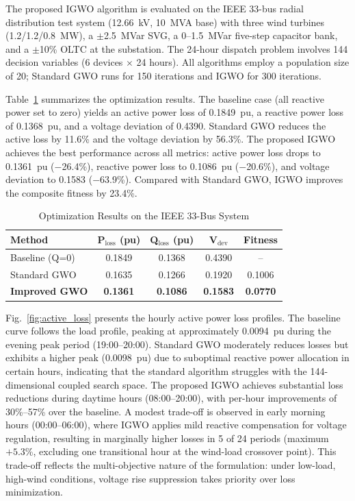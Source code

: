 The proposed IGWO algorithm is evaluated on the IEEE 33-bus radial distribution test system (12.66~kV, 10~MVA base) with three wind turbines (1.2/1.2/0.8~MW), a $\pm$2.5~MVar SVG, a 0--1.5~MVar five-step capacitor bank, and a $\pm$10\% OLTC at the substation. The 24-hour dispatch problem involves 144 decision variables (6 devices $\times$ 24 hours). All algorithms employ a population size of 20; Standard GWO runs for 150 iterations and IGWO for 300 iterations.

Table~\ref{tab:results} summarizes the optimization results. The baseline case (all reactive power set to zero) yields an active power loss of 0.1849~pu, a reactive power loss of 0.1368~pu, and a voltage deviation of 0.4390. Standard GWO reduces the active loss by 11.6\% and the voltage deviation by 56.3\%. The proposed IGWO achieves the best performance across all metrics: active power loss drops to 0.1361~pu ($-$26.4\%), reactive power loss to 0.1086~pu ($-$20.6\%), and voltage deviation to 0.1583 ($-$63.9\%). Compared with Standard GWO, IGWO improves the composite fitness by 23.4\%.

\begin{table}[!t]
  \centering
  \caption{Optimization Results on the IEEE 33-Bus System}
  \label{tab:results}
  \begin{tabular}{lcccc}
    \hline
    Method & P$_{\text{loss}}$ (pu) & Q$_{\text{loss}}$ (pu) & V$_{\text{dev}}$ & Fitness \\
    \hline
    Baseline (Q=0)  & 0.1849 & 0.1368 & 0.4390 & -- \\
    Standard GWO    & 0.1635 & 0.1266 & 0.1920 & 0.1006 \\
    \textbf{Improved GWO} & \textbf{0.1361} & \textbf{0.1086} & \textbf{0.1583} & \textbf{0.0770} \\
    \hline
  \end{tabular}
\end{table}

Fig.~\ref{fig:active_loss} presents the hourly active power loss profiles. The baseline curve follows the load profile, peaking at approximately 0.0094~pu during the evening peak period (19:00--20:00). Standard GWO moderately reduces losses but exhibits a higher peak (0.0098~pu) due to suboptimal reactive power allocation in certain hours, indicating that the standard algorithm struggles with the 144-dimensional coupled search space. The proposed IGWO achieves substantial loss reductions during daytime hours (08:00--20:00), with per-hour improvements of 30\%--57\% over the baseline. A modest trade-off is observed in early morning hours (00:00--06:00), where IGWO applies mild reactive compensation for voltage regulation, resulting in marginally higher losses in 5 of 24 periods (maximum $+5.3$\%, excluding one transitional hour at the wind-load crossover point). This trade-off reflects the multi-objective nature of the formulation: under low-load, high-wind conditions, voltage rise suppression takes priority over loss minimization.


